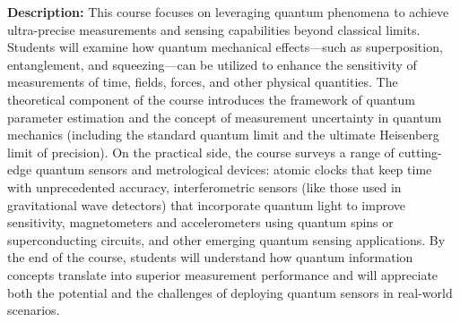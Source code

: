 \documentclass{scrreprt}
\begin{document}
\textbf{Description:} This course focuses on leveraging quantum phenomena to achieve ultra-precise measurements and sensing capabilities beyond classical limits. Students will examine how quantum mechanical effects—such as superposition, entanglement, and squeezing—can be utilized to enhance the sensitivity of measurements of time, fields, forces, and other physical quantities. The theoretical component of the course introduces the framework of quantum parameter estimation and the concept of measurement uncertainty in quantum mechanics (including the standard quantum limit and the ultimate Heisenberg limit of precision). On the practical side, the course surveys a range of cutting-edge quantum sensors and metrological devices: atomic clocks that keep time with unprecedented accuracy, interferometric sensors (like those used in gravitational wave detectors) that incorporate quantum light to improve sensitivity, magnetometers and accelerometers using quantum spins or superconducting circuits, and other emerging quantum sensing applications. By the end of the course, students will understand how quantum information concepts translate into superior measurement performance and will appreciate both the potential and the challenges of deploying quantum sensors in real-world scenarios.
\end{document}
